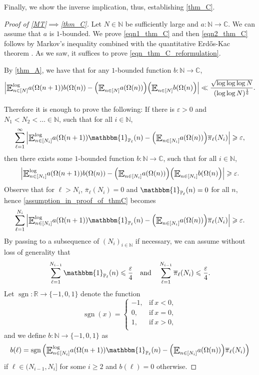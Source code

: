 \documentclass[letter,11pt]{article}
\theoremstyle{plain} %
\theoremstyle{definition} %
\theoremstyle{plain}
\theoremstyle{plain}
\theoremstyle{plain}
\numberwithin{equation}{section}
\newcommand{\Erdos}{Erd\H{o}s}
\newcommand{\N}{\mathbb{N}}
\newcommand{\R}{\mathbb{R}}
\newcommand{\C}{\mathbb{C}}
\renewcommand{\epsilon}{\varepsilon}
\renewcommand{\leq}{\leqslant}
\renewcommand{\geq}{\geqslant}
\renewcommand{\P}{\mathbb{P}}
\newcommand{\E}{\raisebox{-0.4ex}{\scalebox{1.4}[1.3]{$\mathbb{E}$}}}
\newcommand{\Esub}[1]{\raisebox{-0.4ex}{\scalebox{1.4}[1.3]{$\mathbb{E}$}}\raisebox{-0.35ex}{\ensuremath{_{\scriptstyle #1}}}}
\newcommand{\logE}{{\E}^{\log}}
\newcommand{\1}{\mathbbm{1}}
\begin{document}
Finally, we show the inverse implication, thus, establishing \cref{thm_C}.

\begin{proof}[Proof of \cref{MT}$\implies$\cref{thm_C}]
Let $N\in\N$ be sufficiently large and $a\colon\N\to\C$. We can assume that $a$ is $1$-bounded.
We prove \eqref{eqn1_thm_C} and then \eqref{eqn2_thm_C} follows by Markov's inequality combined with the quantitative \Erdos-Kac theorem \cite[Theorem 2]{renyi-turan}. As we saw, it suffices to prove \eqref{eqn_thm_C_reformulation}.

By \cref{thm_A}, we have that for any $1$-bounded function $b\colon\N\to\C$,
$$\Big|\logE_{n\in[N]}a(\Omega(n+1))b(\Omega(n)) - \Big(\Esub{n\in[N]}a(\Omega(n))\Big)\Big(\Esub{n\in[N]}b(\Omega(n)\Big)\Big| 
\ll \frac{\sqrt{\log\log\log{N}}}{(\log\log{N})^\frac{1}{6}}.$$

Therefore it is enough to prove the following:
If there is $\epsilon>0$ and $N_1<N_2<\ldots\in\N$, such that for all $i\in\N$,
\begin{equation}\label{assumption_in_proof_of_thmC}
    \sum_{\ell=1}^\infty \Big|\logE_{n\in[N_i]} a(\Omega(n+1))\1_{\P_\ell}(n) - \Big(\Esub{n\in[N_i]}a(\Omega(n))\Big)\overline{\pi}_\ell(N_i)\Big|
    \geq \epsilon,
\end{equation}
then there exists some $1$-bounded function $b\colon\N\to\C$, such that for all $i\in\N$,
\begin{equation}\label{conclusion_in_proof_of_thmC}
    \Big|\logE_{n\in[N_i]}a(\Omega(n+1))b(\Omega(n)) - \Big(\Esub{n\in[N_i]}a(\Omega(n))\Big)\Big(\Esub{n\in[N_i]}b(\Omega(n)\Big)\Big| \geq \epsilon.
\end{equation}
Observe that for $\ell>N_i$, $\overline{\pi}_\ell(N_i) = 0$ and $\1_{\P_\ell}(n) = 0$ for all $n$, hence \eqref{assumption_in_proof_of_thmC} becomes
\begin{equation}
\label{assumption2_in_proof_of_thmC}
    \sum_{\ell=1}^{N_i} \Big|\logE_{n\in[N_i]} a(\Omega(n+1))\1_{\P_\ell}(n) - \Big(\Esub{n\in[N_i]}a(\Omega(n))\Big)\overline{\pi}_\ell(N_i)\Big|
    \geq \epsilon.
\end{equation}
By passing to a subsequence of $(N_i)_{i\in\N}$ if necessary, we can assume without loss of generality that
\begin{align}
\label{eqn_A_implies_first_half_of_Aprimeprimeprime_2}
\sum_{\ell=1}^{N_{i-1}}\1_{\P_\ell}(n) \leq \frac{\epsilon}{4}
\quad\text{and}\quad
\sum_{\ell=1}^{N_{i-1}} \overline{\pi}_\ell(N_i)\leq \frac{\epsilon}{4}.
\end{align}
Let $\operatorname{sgn}\colon \R\to \{-1,0,1\}$ denote the function
\[
\operatorname{sgn}(x)=
\begin{cases}
-1,&\text{if}~x<0,\\
0,&\text{if}~x=0,\\
1,&\text{if}~x>0,\\
\end{cases}
\]
and we define $b\colon\N \to \{-1,0,1\}$ as
\[
b(\ell)=\operatorname{sgn}\Big(\logE_{n\in[N_i]} a(\Omega(n+1))\1_{\P_\ell}(n) - \Big(\Esub{n\in[N_i]}a(\Omega(n))\Big)\overline{\pi}_\ell(N_i)\Big)
\]
if $\ell\in (N_{i-1},N_i]$ for some $i\geq 2$ and $b(\ell)=0$ otherwise.


\end{proof}
\end{document}
